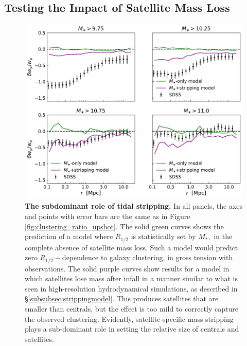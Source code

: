 \documentclass[usenatbib,usegraphicx,letterpaper]{mn2e}
\newcommand{\rhalf}{R_{1/2}}
\newcommand{\mstar}{M_{\ast}}
\begin{document}
\subsection{Testing the Impact of Satellite Mass Loss}
\label{subsec:mstar_stripping}
\begin{figure}
\centering
\includegraphics[width=12cm]{FIGS/alt_model_wp_ratios.pdf}
\caption{
{\bf The subdominant role of tidal stripping.}
In all panels, the axes and points with error bars are the same as in Figure \ref{fig:clustering_ratio_upshot}. The solid green curves shows the prediction of a model where $\rhalf$ is statistically set by $\mstar,$ in the complete absence of satellite mass loss. Such a model would predict zero $\rhalf-$dependence to galaxy clustering, in gross tension with observations. The solid purple curves show results for a model in which satellites lose mass after infall in a manner similar to what is seen in high-resolution hydrodynamical simulations, as described in \S\ref{subsubsec:strippingmodel}. This produces satellites that are smaller than centrals, but the effect is too mild to correctly capture the observed clustering. Evidently, satellite-specific mass stripping plays a sub-dominant role in setting the relative size of centrals and satellites.
}
\label{fig:mstarmodelclustering}
\end{figure}
\end{document}

